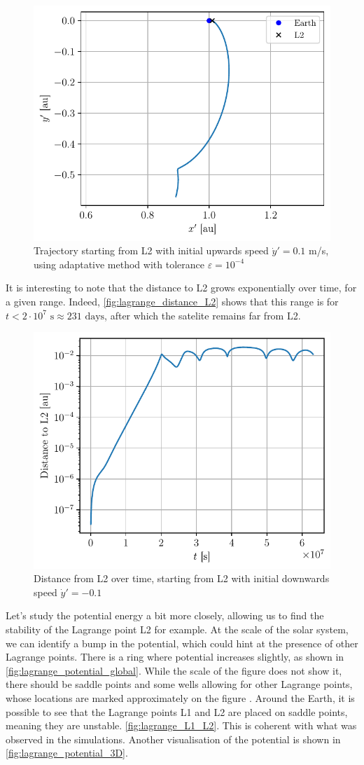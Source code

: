 \begin{figure}[h]
    \centering
    \includegraphics[width=0.6\linewidth]{figures/lagrange_v0_up.pdf}
    \caption{Trajectory starting from L2 with initial upwards speed \(\dot y' = 0.1\) m/s, using adaptative method with tolerance \(\varepsilon = 10^{-4}\)}
    \label{fig:lagrange_v0_up}
\end{figure}

It is interesting to note that the distance to L2 grows exponentially over time, for a given range. Indeed, \autoref{fig:lagrange_distance_L2} shows that this range is for \(t < 2 \cdot 10^7 \textrm{ s} \approx 231 \textrm{ days}\), after which the satelite remains far from L2.

\begin{figure}[h]
    \centering
    \includegraphics[width=0.6\linewidth]{figures/lagrange_exponential_distance.pdf}
    \caption{Distance from L2 over time, starting from L2 with initial downwards speed \(\dot y' = -0.1\)}
    \label{fig:lagrange_distance_L2}
\end{figure}

Let's study the potential energy a bit more closely, allowing us to find the stability of the Lagrange point L2 for example. At the scale of the solar system, we can identify a bump in the potential, which could hint at the presence of other Lagrange points. There is a ring where potential increases slightly, as shown in \autoref{fig:lagrange_potential_global}. While the scale of the figure does not show it, there should be saddle points and some wells allowing for other Lagrange points, whose locations are marked approximately on the figure \cite{lagrange}. Around the Earth, it is possible to see that the Lagrange points L1 and L2 are placed on saddle points, meaning they are unstable. \autoref{fig:lagrange_L1_L2}. This is coherent with what was observed in the simulations. Another visualisation of the potential is shown in \autoref{fig:lagrange_potential_3D}.

